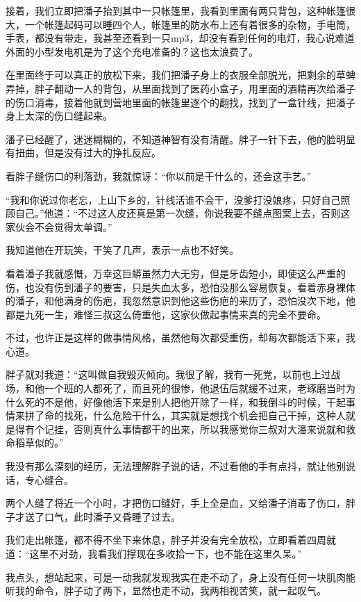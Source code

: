 接着，我们立即把潘子抬到其中一只帐篷里，我看到里面有两只背包，这种帐篷很大，一个帐篷起码可以睡四个人，帐篷里的防水布上还有着很多的杂物，手电筒，手表，都没有带走，我甚至还看到一只mp3，却没有看到任何的电灯，我心说难道外面的小型发电机是为了这个充电准备的？这也太浪费了。

在里面终于可以真正的放松下来，我们把潘子身上的衣服全部脱光，把剩余的草蜱弄掉，胖子翻动一人的背包，从里面找到了医药小盒子，用里面的酒精再次给潘子的伤口消毒，接着他就到营地里面的帐篷里逐个的翻找，找到了一盒针线，把潘子身上太深的伤口缝起来。

潘子已经醒了，迷迷糊糊的，不知道神智有没有清醒。胖子一针下去，他的脸明显有扭曲，但是没有过大的挣扎反应。

看胖子缝伤口的利落劲，我就惊讶：“你以前是干什么的，还会这手艺。”

“我和你说过你老忘，上山下乡的，针线活谁不会干，没爹打没娘疼，只好自己照顾自己。”他道：“不过这人皮还真是第一次缝，你说我要不缝点图案上去，否则这家伙会不会觉得太单调。”

我知道他在开玩笑，干笑了几声，表示一点也不好笑。

看着潘子我就感慨，万幸这巨蟒虽然力大无穷，但是牙齿短小，即使这么严重的伤，也没有伤到潘子的要害，只是失血太多，恐怕没那么容易恢复。看着赤身裸体的潘子，和他满身的伤疤，我忽然意识到他这些伤疤的来历了，恐怕没次下地，他都是九死一生，难怪三叔这么倚重他，这家伙做起事情来真的完全不要命。

不过，也许正是这样的做事情风格，虽然他每次都受重伤，却每次都能活下来，我心道。

胖子就对我道：“这叫做自我毁灭倾向。我很了解，我有一死党，以前也上过战场，和他一个班的人都死了，而且死的很惨，他退伍后就缓不过来，老琢磨当时为什么死的不是他，好像他活下来是别人把他开除了一样，和我倒斗的时候，干起事情来拼了命的找死，什么危险干什么，其实就是想找个机会把自己干掉，这种人就是得有个记挂，否则真什么事情都干的出来，所以我感觉你三叔对大潘来说就和救命稻草似的。”

我没有那么深刻的经历，无法理解胖子说的话，不过看他的手有点抖，就让他别说话，专心缝合。

两个人缝了将近一个小时，才把伤口缝好，手上全是血，又给潘子消毒了伤口，胖子才送了口气，此时潘子又昏睡了过去。

我们走出帐篷，都不得不坐下来休息，胖子并没有完全放松，立即看着四周就道：“这里不对劲，我看我们撑现在多收拾一下，也不能在这里久呆。”

我点头，想站起来，可是一动我就发现我实在走不动了，身上没有任何一块肌肉能听我的命令，胖子动了两下，显然也走不动，我两相视苦笑，就一起叹气。

